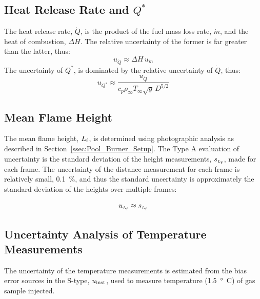 \documentclass[12pt]{article}
\begin{document}
\subsection{Heat Release Rate and $Q^*$ }
\label{ssec:Heat_Release_Rate}

The heat release rate, $\dot{Q}$, is the product of the fuel mass loss rate, $\dot{m}$, and the heat of combustion, $\Delta H$. The relative uncertainty of the former is far greater than the latter, thus:
\begin{equation}
\label{eq:heat_release_rate_uncertainty}
u_{\scriptscriptstyle \dot{Q}} \approx \Delta H \, u_{\dot{m}}
\end{equation}
The uncertainty of ${Q^*}$, is dominated by the relative uncertainty of $\dot{Q}$, thus:
\begin{equation}
\label{eq:Q*_uncertainty}
u_{\scriptscriptstyle {Q^*}} \approx \frac{u_{\scriptscriptstyle \dot{Q}}}{c_{p}\rho_\infty T_\infty \sqrt{g} \, D^{5/2}}
\end{equation}

\subsection{Mean Flame Height}
\label{ssec:Mean_Flame_Height}

The mean flame height, ${L_{\rm{f}}}$, is determined using photographic analysis as described in Section~\ref{ssec:Pool_Burner_Setup}. The Type A evaluation of uncertainty is the standard deviation of the height measurements, $s_{\scriptscriptstyle L_{\rm{f}}}$, made for each frame. The uncertainty of the distance measurement for each frame is relatively small, 0.1~\%, and thus the standard uncertainty is approximately the standard deviation of the heights over multiple frames:

\begin{equation}
\label{eq:mean_flame_height}
u_{\scriptscriptstyle L_{\rm{f}}} \approx s_{\scriptscriptstyle{L_{\rm f}}}
\end{equation}


\subsection{Uncertainty Analysis of Temperature Measurements}
\label{sec:Uncertainty_Temperature_Measurements}
The uncertainty of the temperature measurements is estimated from the bias error sources in the S-type, $u_{\rm inst}$, used to measure temperature (\SI{1.5}{\degree C}) of gas sample injected.
\end{document}
